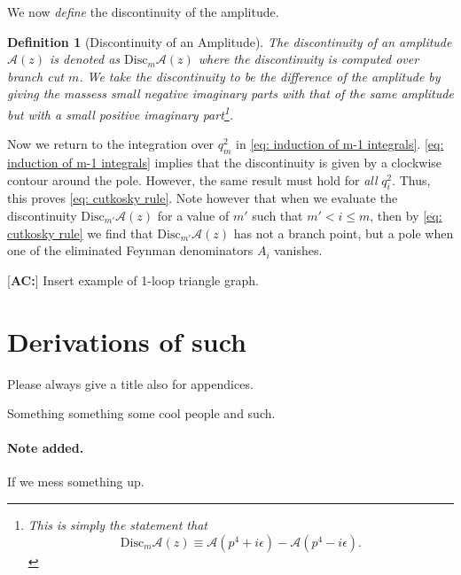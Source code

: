 \documentclass[a4paper,11pt]{article}
\newtheorem{definition}{Definition}
\newcommand{\ac}[1]{\textcolor{green3}{[\textbf{AC:}] #1}}
\begin{document}
We now \textit{define} the discontinuity of the amplitude.
\begin{definition}[Discontinuity of an Amplitude]
    The discontinuity of an amplitude $\mathcal{A}(z)$ is denoted as $\text{Disc}_m\mathcal{A}(z)$ where the discontinuity is computed over branch cut $m$. We take the discontinuity to be the difference of the amplitude by giving the massess small \textit{negative} imaginary parts with that of the same amplitude but with a small \textit{positive} imaginary part\footnote{This is simply the statement that \begin{equation}\label{eq: definition of the discontinuity of an amplitude}
        \text{Disc}_m\mathcal{A}(z)\equiv \mathcal{A}(p^4 + i\epsilon) - \mathcal{A}(p^4-i\epsilon).
    \end{equation}}.
\end{definition}
Now we return to the integration over $q_m^2$ in \eqref{eq: induction of m-1 integrals}. \eqref{eq: induction of m-1 integrals} implies that the discontinuity is given by a clockwise contour around the pole. However, the same result must hold for \textit{all} $q_i^2$. Thus, this proves \eqref{eq: cutkosky rule}. Note however that when we evaluate the discontinuity $\text{Disc}_{m'}\mathcal{A}(z)$ for a value of $m'$ such that $m'<i\leq m$, then by \eqref{eq: cutkosky rule} we find that $\text{Disc}_{m'}\mathcal{A}(z)$ has not a branch point, but a pole when one of the eliminated Feynman denominators $A_i$ vanishes. 

\ac{Insert example of 1-loop triangle graph.}

\appendix
\section{Derivations of such}
Please always give a title also for appendices.





\acknowledgments

Something something some cool people and such.

\paragraph{Note added.} If we mess something up.
\end{document}
